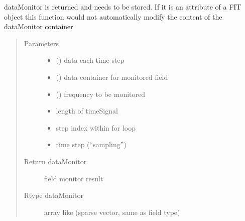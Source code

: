 \documentclass[letterpaper,10pt,english]{sphinxmanual}
\begin{document}
\begin{fulllineitems}
\begin{fulllineitems}
dataMonitor is returned and needs to be stored. If it is an attribute of a FIT object this function would not automatically modify the content of the dataMonitor container
\begin{quote}\begin{description}
\item[{Parameters}] \leavevmode\begin{itemize}
\item {} 
 (\sphinxstyleliteralemphasis{\sphinxupquote{ (}}\sphinxstyleliteralemphasis{\sphinxupquote{, }}\sphinxstyleliteralemphasis{\sphinxupquote{)}}) \textendash{} data each time step

\item {} 
 (\sphinxstyleliteralemphasis{\sphinxupquote{ (}}\sphinxstyleliteralemphasis{\sphinxupquote{, }}\sphinxstyleliteralemphasis{\sphinxupquote{)}}) \textendash{} data container for monitored field

\item {} 
 () \textendash{} frequency to be monitored

\item {} 
 \textendash{} length of timeSignal

\item {} 
 \textendash{} step index within for loop

\item {} 
 \textendash{} time step (“sampling”)

\end{itemize}

\item[{Return dataMonitor}] \leavevmode
field monitor result

\item[{Rtype dataMonitor}] \leavevmode
array like (sparse vector, same as field type)


\end{description}
\end{quote}
\end{fulllineitems}
\end{fulllineitems}
\end{document}
